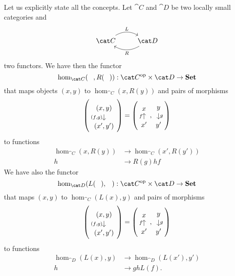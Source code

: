 \begin{example}
\YetToBeTeXed
\end{example}

Let us explicitly state all the concepts. Let \(\cat C\) and \(\cat D\) be two locally small categories and
\[\begin{tikzcd} \cat C \ar["L", r, bend left] & \cat D \ar["R", l, bend left] \end{tikzcd}\]
two functors. We have then the functor
\[\hom_{\cat C}(\hole, R(\hole)) : \opcat C \times \cat D \to \Set\]
that maps objects \((x, y)\) to \(\hom_{\cat C}(x, R(y))\) and pairs of morphisms
\[\left(\begin{tikzcd}[row sep=small](x, y) \ar["{(f, g)}", d, swap] \\ (x', y')\end{tikzcd}\right) = \left(\begin{tikzcd}[row sep=small]x \\ x' \ar["f", u]\end{tikzcd}, \begin{tikzcd}[row sep=small]y \ar["g", d] \\ y'\end{tikzcd}\right)\]
to functions
\[\begin{aligned}
\hom_{\cat C}(x, R(y)) &\to \hom_{\cat C}(x', R(y')) \\
h &\to R(g) h f
\end{aligned}\]
We have also the functor
\[\hom_{\cat D}(L(\hole), \hole) : \opcat C \times \cat D \to \Set\]
that maps \((x, y)\) to \(\hom_{\cat C}(L(x), y)\) and pairs of morphisms
\[\left(\begin{tikzcd}[row sep=small](x, y) \ar["{(f, g)}", d, swap] \\ (x', y')\end{tikzcd}\right) = \left(\begin{tikzcd}[row sep=small]x \\ x' \ar["f", u]\end{tikzcd}, \begin{tikzcd}[row sep=small]y \ar["g", d] \\ y'\end{tikzcd}\right)\]
to functions
\[\begin{aligned}
\hom_{\cat D}(L(x), y) &\to \hom_{\cat D}(L(x'), y') \\
h &\to g h L(f) .
\end{aligned}\]

